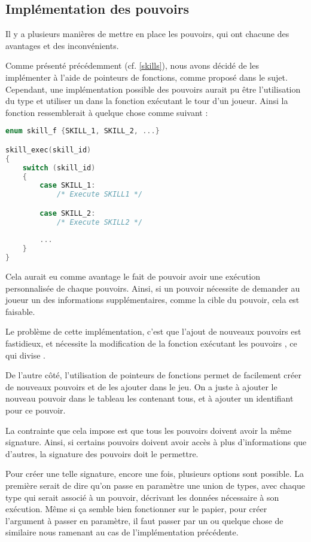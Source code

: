 
\subsection{Implémentation des pouvoirs}

Il y a plusieurs manières de mettre en place les pouvoirs, qui ont chacune des avantages et des inconvénients.

Comme présenté précédemment (cf. \ref{skills}), nous avons décidé de les implémenter à l'aide de pointeurs de fonctions, comme proposé dans le sujet. Cependant, une implémentation possible des pouvoirs aurait pu être l'utilisation du type  et utiliser un  dans la fonction exécutant le tour d'un joueur. Ainsi la fonction  ressemblerait à quelque chose comme suivant : 

\begin{lstlisting}[language=c, frame=single, caption={Pseudocode de la version possible de skill\_exec avec un switch}]
enum skill_f {SKILL_1, SKILL_2, ...}

skill_exec(skill_id)
{
    switch (skill_id)
    {
        case SKILL_1:
            /* Execute SKILL1 */

        case SKILL_2:
            /* Execute SKILL2 */
            
        ...
    }
}

\end{lstlisting}

Cela aurait eu comme avantage le fait de pouvoir avoir une exécution personnalisée de chaque pouvoirs. Ainsi, si un pouvoir nécessite de demander au joueur un des informations supplémentaires, comme la cible du pouvoir, cela est faisable.

Le problème de cette implémentation, c'est que l'ajout de nouveaux pouvoirs est fastidieux, et nécessite la modification de la fonction exécutant les pouvoirs , ce qui divise .

De l'autre côté, l'utilisation de pointeurs de fonctions permet de facilement créer de nouveaux pouvoirs et de les ajouter dans le jeu. On a juste à ajouter le nouveau pouvoir dans le tableau les contenant tous, et à ajouter un identifiant pour ce pouvoir.

La contrainte que cela impose est que tous les pouvoirs doivent avoir la même signature. Ainsi, si certains pouvoirs doivent avoir accès à plus d'informations que d'autres, la signature des pouvoirs doit le permettre.

Pour créer une telle signature, encore une fois, plusieurs options sont possible. La première serait de dire qu'on passe en paramètre une union de types, avec chaque type qui serait associé à un pouvoir, décrivant les données nécessaire à son exécution. Même si ça semble bien fonctionner sur le papier, pour créer l'argument à passer en paramètre, il faut passer par un  ou quelque chose de similaire nous ramenant au cas de l'implémentation précédente.

